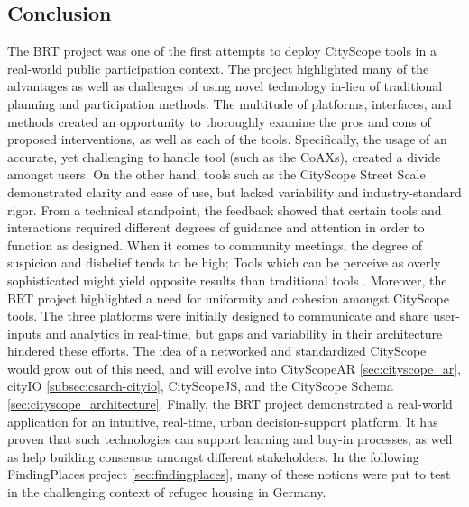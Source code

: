 {{        \subsection{Conclusion}
        {
            The BRT project was one of the first attempts to deploy CityScope tools in a real-world public participation context. The project highlighted many of the advantages as well as challenges of using novel technology in-lieu of traditional planning and participation methods. The multitude of platforms, interfaces, and methods created an opportunity to thoroughly examine the pros and cons of proposed interventions, as well as each of the tools. Specifically, the usage of an accurate, yet challenging to handle tool (such as the CoAXs), created a divide amongst users. On the other hand, tools such as the CityScope Street Scale demonstrated clarity and ease of use, but lacked variability and industry-standard rigor.
            \newline
            From a technical standpoint, the feedback showed that certain tools and interactions required different degrees of guidance and attention in order to function as designed. When it comes to community meetings, the degree of suspicion and disbelief tends to be high; Tools which can be perceive as overly sophisticated might yield opposite results than traditional tools \cite{Innes2016, ben-joseph2001}. Moreover, the BRT project highlighted a need for uniformity and cohesion amongst CityScope tools. The three platforms were initially designed to communicate and share user-inputs and analytics in real-time, but gaps and variability in their architecture hindered these efforts. The idea of a networked and standardized CityScope would grow out of this need, and will evolve into CityScopeAR \eqref{sec:cityscope_ar}, cityIO \eqref{subsec:csarch-cityio}, CityScopeJS, and the CityScope Schema \eqref{sec:cityscope_architecture}.
            \newline
            Finally, the BRT project demonstrated a real-world application for an intuitive, real-time, urban decision-support platform. It has proven that such technologies can support learning and buy-in processes, as well as help building consensus amongst different stakeholders. In the following FindingPlaces project \eqref{sec:findingplaces}, many of these notions were put to test in the challenging context of refugee housing in Germany.
        }
    }
}

